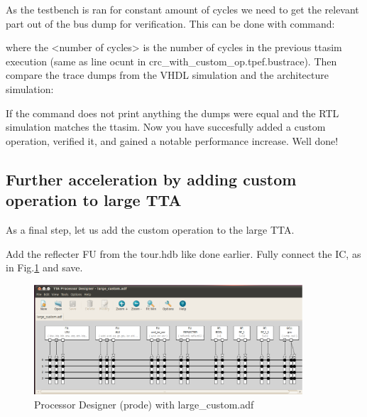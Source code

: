 \documentclass[twoside]{tceusermanual}
\begin{document}
As the testbench is ran for constant amount of cycles we
need to get the relevant part out of the bus dump for
verification. This can be done with command:


where the <number of cycles> is the number of cycles in the previous
ttasim execution (same as line ocunt in
crc\_with\_custom\_op.tpef.bustrace). Then compare the trace dumps
from the VHDL simulation and the architecture simulation:


If the command does not print anything the dumps were equal and the RTL
simulation matches the ttasim. Now you have succesfully added a custom
operation, verified it, and gained a notable performance increase. Well
done!


\subsection{Further acceleration by adding custom operation to large TTA}
\label{ssec:large_custom}

As a final step, let us add the custom operation to the large TTA.



%

Add the reflecter FU from the tour.hdb like done earlier. Fully
connect the IC, as in Fig.\ref{fig:prode_largecustom} and save.

\begin{figure}
  \begin{center}
    \includegraphics[width=10cm]{eps/prode_largecustom}
    \caption{Processor Designer (prode) with large\_custom.adf}
    \label{fig:prode_largecustom}
  \end{center}
\end{figure}
\end{document}
